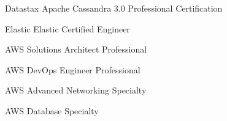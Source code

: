 



\begin{cvhonors}


\cvhonor
{Datastax} %
{Apache Cassandra 3.0 Professional Certification} %
{} %
{} %


\cvhonor
{Elastic} %
{Elastic Certified Engineer} %
{} %
{} %



\end{cvhonors}




\begin{cvhonors}


\cvhonor
{AWS Solutions Architect} %
{Professional} %
{} %
{} %


\cvhonor
{AWS DevOps Engineer} %
{Professional} %
{} %
{} %


\cvhonor
{AWS Advanced Networking} %
{Specialty} %
{} %
{} %


\cvhonor
{AWS Database} %
{Specialty} %
{} %
{} %


\end{cvhonors}